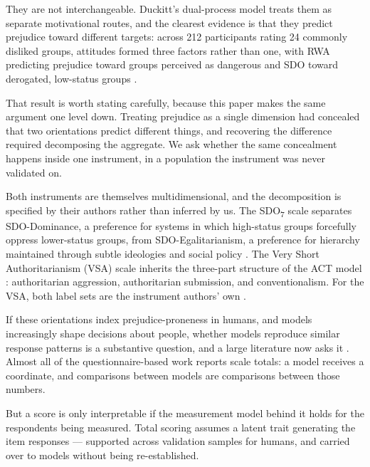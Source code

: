 \documentclass{article}
\begin{document}
They are not interchangeable. Duckitt's dual-process model
\citep{duckitt2001, duckittsibley2010} treats them as separate
motivational routes, and the clearest evidence is that they predict
prejudice toward different targets: across 212 participants rating 24
commonly disliked groups, attitudes formed three factors rather than
one, with RWA predicting prejudice toward groups perceived as dangerous
and SDO toward derogated, low-status groups
\citep{duckitt2007, asbrock2010, perry2013}.

That result is worth stating carefully, because this paper makes the
same argument one level down. Treating prejudice as a single dimension
had concealed that two orientations predict different things, and
recovering the difference required decomposing the aggregate. We ask
whether the same concealment happens inside one instrument, in a
population the instrument was never validated on.

Both instruments are themselves multidimensional, and the decomposition
is specified by their authors rather than inferred by us. The
SDO\textsubscript{7} scale separates SDO-Dominance, a preference for
systems in which high-status groups forcefully oppress lower-status
groups, from SDO-Egalitarianism, a preference for hierarchy maintained
through subtle ideologies and social policy \citep{ho2015}. The Very
Short Authoritarianism (VSA) scale inherits the three-part structure of
the ACT model \citep{duckitt2010act, duckitt2013}: authoritarian
aggression, authoritarian submission, and conventionalism. For the VSA,
both label sets are the instrument authors' own \citep{bizumic2018}.

If these orientations index prejudice-proneness in humans, and models
increasingly shape decisions about people, whether models reproduce
similar response patterns is a substantive question, and a large
literature now asks it
\citep{hartmann2023, motoki2024, rozado2024, feng2023, buyl2026, lukasik2026, pellert2024}.
Almost all of the questionnaire-based work reports scale totals: a model
receives a coordinate, and comparisons between models are comparisons
between those numbers.

But a score is only interpretable if the measurement model behind it
holds for the respondents being measured. Total scoring assumes a latent
trait generating the item responses --- supported across validation
samples for humans, and carried over to models without being
re-established.
\end{document}
